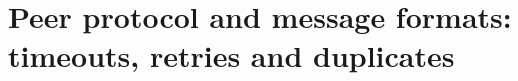\section{Peer protocol and message formats: timeouts, retries and duplicates}
\label{sec:peerproto}
%
